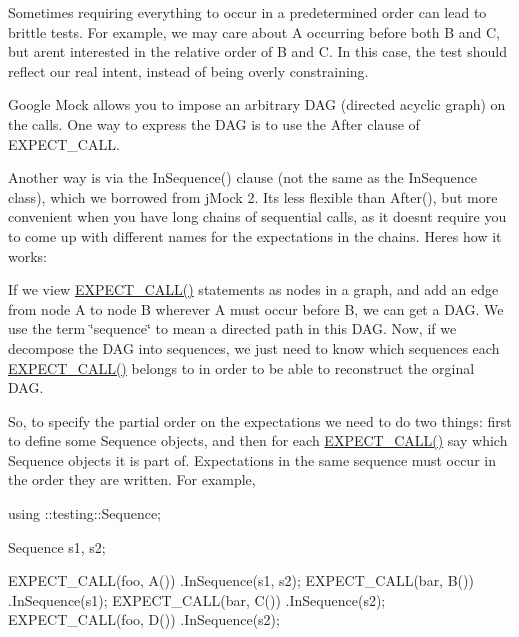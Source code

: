 Sometimes requiring everything to occur in a predetermined order can lead to brittle tests. For example, we may care about {\ttfamily A} occurring before both {\ttfamily B} and {\ttfamily C}, but aren\textquotesingle{}t interested in the relative order of {\ttfamily B} and {\ttfamily C}. In this case, the test should reflect our real intent, instead of being overly constraining.

Google Mock allows you to impose an arbitrary D\+AG (directed acyclic graph) on the calls. One way to express the D\+AG is to use the After clause of {\ttfamily E\+X\+P\+E\+C\+T\+\_\+\+C\+A\+LL}.

Another way is via the {\ttfamily In\+Sequence()} clause (not the same as the {\ttfamily In\+Sequence} class), which we borrowed from j\+Mock 2. It\textquotesingle{}s less flexible than {\ttfamily After()}, but more convenient when you have long chains of sequential calls, as it doesn\textquotesingle{}t require you to come up with different names for the expectations in the chains. Here\textquotesingle{}s how it works\+:

If we view {\ttfamily \hyperlink{gmock-spec-builders_8h_a535a6156de72c1a2e25a127e38ee5232}{E\+X\+P\+E\+C\+T\+\_\+\+C\+A\+L\+L()}} statements as nodes in a graph, and add an edge from node A to node B wherever A must occur before B, we can get a D\+AG. We use the term \char`\"{}sequence\char`\"{} to mean a directed path in this D\+AG. Now, if we decompose the D\+AG into sequences, we just need to know which sequences each {\ttfamily \hyperlink{gmock-spec-builders_8h_a535a6156de72c1a2e25a127e38ee5232}{E\+X\+P\+E\+C\+T\+\_\+\+C\+A\+L\+L()}} belongs to in order to be able to reconstruct the orginal D\+AG.

So, to specify the partial order on the expectations we need to do two things\+: first to define some {\ttfamily Sequence} objects, and then for each {\ttfamily \hyperlink{gmock-spec-builders_8h_a535a6156de72c1a2e25a127e38ee5232}{E\+X\+P\+E\+C\+T\+\_\+\+C\+A\+L\+L()}} say which {\ttfamily Sequence} objects it is part of. Expectations in the same sequence must occur in the order they are written. For example,


\begin{DoxyCode}
using ::testing::Sequence;

Sequence s1, s2;

EXPECT\_CALL(foo, A())
    .InSequence(s1, s2);
EXPECT\_CALL(bar, B())
    .InSequence(s1);
EXPECT\_CALL(bar, C())
    .InSequence(s2);
EXPECT\_CALL(foo, D())
    .InSequence(s2);
\end{DoxyCode}


